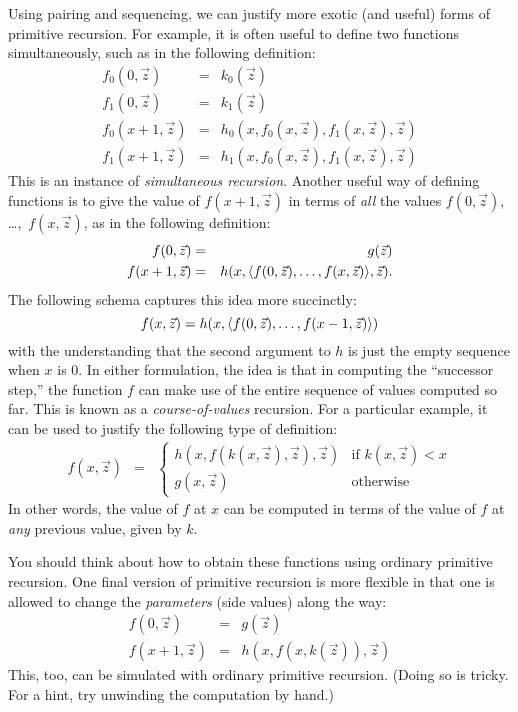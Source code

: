 \documentclass[../../include/open-logic-section]{subfiles}
\begin{document}

Using pairing and sequencing, we can justify more exotic (and
useful) forms of primitive recursion. For example, it is often useful
to define two functions simultaneously, such as in the following
definition:
\begin{eqnarray*}
f_0(0,\vec z) & = & k_0(\vec z) \\
f_1(0,\vec z) & = & k_1(\vec z) \\
f_0(x+1,\vec z) & = & h_0(x,f_0(x,\vec z),f_1(x,\vec z),\vec z) \\
f_1(x+1,\vec z) & = & h_1(x,f_0(x,\vec z),f_1(x,\vec z),\vec z)
\end{eqnarray*}
This is an instance of \emph{simultaneous recursion}. Another useful
way of defining functions is to give the value of $f(x+1,\vec z)$ in
terms of \emph{all} the values $f(0,\vec z)$, \dots,~$f(x,\vec z)$, as in
the following definition:
\begin{eqnarray*}
f(0,\vec z) & = & g(\vec z) \\
f(x+1,\vec z) & = & h(x, \tuple{f(0,\vec z), \dots, f(x,\vec z)},
\vec z).
\end{eqnarray*}
The following schema captures this idea more succinctly:
\[
f(x,\vec z) = h(x,\langle f(0,\vec z), \dots, f(x-1,\vec z) \rangle)
\]
with the understanding that the second argument to $h$ is just the
empty sequence when $x$ is $0$. In either formulation, the idea is
that in computing the ``successor step,'' the function $f$ can make
use of the entire sequence of values computed so far.
This is known as a \emph{course-of-values} recursion. For a particular
example, it can be used to justify the following type of definition:
\begin{eqnarray*}
f(x,\vec z) & = & \left\{
\begin{array}{ll}
  h(x,f(k(x,\vec z),\vec z),\vec z) & \text{if $k(x,\vec z) < x$} \\
  g(x,\vec z) & \text{otherwise}
\end{array}\right.
\end{eqnarray*}
In other words, the value of $f$ at $x$ can be computed in terms of
the value of $f$ at \emph{any} previous value, given by $k$.

You should think about how to obtain these functions using ordinary
primitive recursion. One final version of primitive recursion is more
flexible in that one is allowed to change the \emph{parameters} (side
values) along the way:
\begin{eqnarray*}
f(0,\vec z) & = & g(\vec z) \\
f(x+1,\vec z) & = & h(x,f(x,k(\vec z)),\vec z)
\end{eqnarray*}
This, too, can be simulated with ordinary primitive recursion. (Doing
so is tricky. For a hint, try unwinding the computation by hand.)
\end{document}
